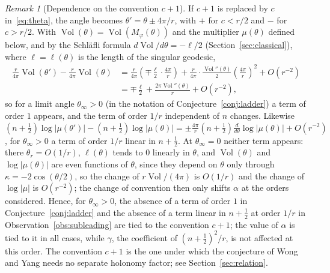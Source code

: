 \documentclass[11pt]{amsart}
\theoremstyle{definition}
\theoremstyle{remark}
\newtheorem{remark}[conjecture]{Remark}
\newcommand{\Vol}{\operatorname{Vol}}
\begin{document}
\begin{remark}[Dependence on the convention $c+1$]\label{rem:convention}
If $c+1$ is replaced by $c$ in~\eqref{eq:theta}, the angle becomes
$\theta' = \theta \pm 4\pi/r$, with $+$ for $c < r/2$ and $-$ for $c > r/2$. With
$\Vol(\theta) = \Vol(M_\varphi(\theta))$ and the multiplier $\mu(\theta)$ defined
below, and by the
Schl\"afli formula $d\Vol/d\theta = -\ell/2$ (Section~\ref{sec:classical}), where
$\ell = \ell(\theta)$ is the length of the singular geodesic,
\begin{align*}
\frac{r}{4\pi}\Vol(\theta') - \frac{r}{4\pi}\Vol(\theta)
&= \frac{r}{4\pi}\left(\mp\frac{\ell}{2}\cdot\frac{4\pi}{r}\right)
+ \frac{r}{4\pi}\cdot\frac{\Vol''(\theta)}{2}\left(\frac{4\pi}{r}\right)^2 + O(r^{-2})\\
&= \mp\frac{\ell}{2} + \frac{2\pi\Vol''(\theta)}{r} + O(r^{-2}),
\end{align*}
so for a limit angle $\theta_\infty > 0$ (in the notation of
Conjecture~\ref{conj:ladder}) a term of order $1$ appears, and the term of order
$1/r$ independent of $n$ changes. Likewise
$(n+\frac12)\log|\mu(\theta')| - (n+\frac12)\log|\mu(\theta)| = \pm\frac{4\pi}{r}
(n+\frac12)\frac{d}{d\theta}\log|\mu(\theta)| + O(r^{-2})$, for $\theta_\infty > 0$
a term of order $1/r$ linear in $n+\frac12$. At $\theta_\infty = 0$ neither term
appears: there $\theta_r = O(1/r)$, $\ell(\theta)$ tends to $0$ linearly in
$\theta$, and $\Vol(\theta)$ and $\log|\mu(\theta)|$ are even functions of $\theta$,
since they depend on $\theta$ only through $\kappa = -2\cos(\theta/2)$, so the change
of $r\Vol/(4\pi)$ is $O(1/r)$ and the change of $\log|\mu|$ is $O(r^{-2})$; the change
of convention then only shifts $\alpha$ at the orders considered. Hence, for
$\theta_\infty > 0$, the absence of a term of order $1$ in
Conjecture~\ref{conj:ladder} and the absence of a term linear in $n+\frac12$ at order
$1/r$ in Observation~\ref{obs:subleading} are tied to the convention $c+1$; the value
of $\alpha$ is tied to it in all cases, while $\gamma$, the coefficient of
$(n+\frac12)^2/r$, is not affected at this order. The convention $c+1$ is the one under which the conjecture of
Wong and Yang needs no separate holonomy factor; see
Section~\ref{sec:relation}.
\end{remark}
\end{document}
